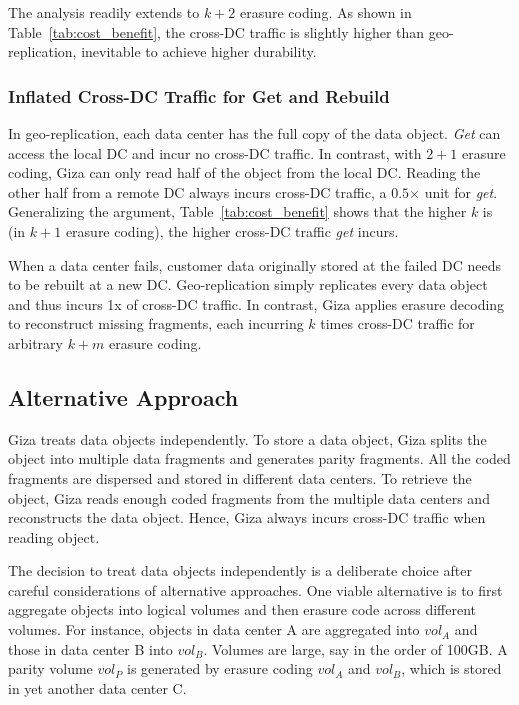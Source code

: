 The analysis readily extends to $k+2$ erasure coding. As shown in Table~\ref{tab:cost_benefit}, the cross-DC traffic is slightly higher than geo-replication, inevitable to achieve higher durability.

\subsubsection{Inflated Cross-DC Traffic for Get and Rebuild}

In geo-replication, each data center has the full copy of the data object. {\em Get} can access the local DC and incur no cross-DC traffic. In contrast, with $2+1$ erasure coding, Giza can only read half of the object from the local DC. Reading the other half from a remote DC always incurs cross-DC traffic, a $0.5$$\times$ unit for {\em get}. Generalizing the argument, Table~\ref{tab:cost_benefit} shows that the higher $k$ is (in $k+1$ erasure coding), the higher cross-DC traffic {\em get} incurs.

When a data center fails, customer data originally stored at the failed DC needs to be rebuilt at a new DC. Geo-replication simply replicates every data object and thus incurs 1x of cross-DC traffic. In contrast, Giza applies erasure decoding to reconstruct missing fragments, each incurring $k$ times cross-DC traffic for arbitrary $k+m$ erasure coding.

\subsection{Alternative Approach}
\label{sec:alternative}


Giza treats data objects independently. To store a data object, Giza splits the object into multiple data fragments and generates parity fragments. All the coded fragments are dispersed and stored in different data centers. To retrieve the object, Giza reads enough coded fragments from the multiple data centers and reconstructs the data object. Hence, Giza always incurs cross-DC traffic when reading object.

The decision to treat data objects independently is a deliberate choice after careful considerations of alternative approaches. One viable alternative is to first aggregate objects into logical volumes and then erasure code across different volumes. For instance, objects in data center A are aggregated into $vol_A$ and those in data center B into $vol_B$. Volumes are large, say in the order of 100GB. A parity volume $vol_P$ is generated by erasure coding $vol_A$ and $vol_B$, which is stored in yet another data center C.

